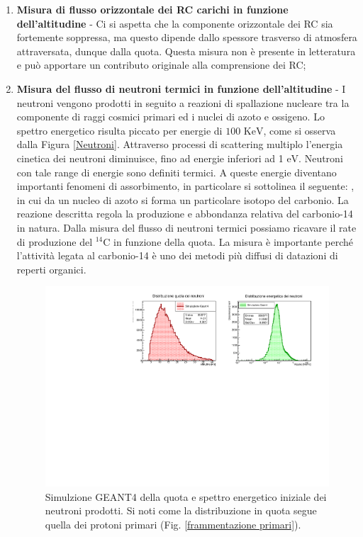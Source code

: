 \begin{enumerate}
    \item \textbf{Misura di flusso orizzontale dei RC carichi in funzione dell'altitudine} - Ci si aspetta che la componente orizzontale dei RC sia fortemente soppressa, ma questo dipende dallo spessore trasverso di atmosfera attraversata, dunque dalla quota. Questa misura non è presente in letteratura e può apportare un contributo originale alla comprensione dei RC;
    \item \textbf{Misura del flusso di neutroni termici in funzione dell'altitudine} - I neutroni vengono prodotti in seguito a reazioni di spallazione nucleare tra la componente di raggi cosmici primari ed i nuclei di azoto e ossigeno. Lo spettro energetico risulta piccato per energie di $100\text{ KeV}$, come si osserva dalla Figura \ref{Neutroni}. Attraverso processi di scattering multiplo l'energia cinetica dei neutroni diminuisce, fino ad energie inferiori ad 1 $\text{eV}$. Neutroni con tale range di energie sono definiti termici. A queste energie diventano importanti fenomeni di assorbimento, in particolare si sottolinea il seguente:
, in cui da un nucleo di azoto si forma un particolare isotopo del carbonio. La reazione descritta regola la produzione e abbondanza relativa del carbonio-14 in natura. Dalla misura del flusso di neutroni termici possiamo ricavare il rate di produzione del $^{14}\text{C}$ in funzione della quota.
La misura è importante perché l'attività legata al carbonio-14 è uno dei metodi più diffusi di datazioni di reperti organici. 
\begin{figure}
    \centering
    \includegraphics[width=.9\linewidth]{Neutroni.pdf}
    \caption{Simulzione GEANT4 della quota e spettro energetico iniziale dei neutroni prodotti. Si noti come la distribuzione in quota segue quella dei protoni primari (Fig. \ref{frammentazione primari}).}

\end{figure}
\end{enumerate}
